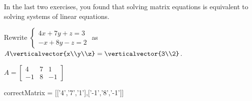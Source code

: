 \documentclass{ximera}
\begin{document}
In the last two exercises, you found that solving matrix equations is equivalent to solving systems of linear equations.

\begin{question}
  Rewrite  $\begin{cases}4x+7y+z =3\\ -x+8y-z =2\end{cases}$ as $A\verticalvector{x\\y\\z} = \verticalvector{3\\2}$.
  \begin{solution}
  	\begin{hint}
  		$A = \begin{bmatrix} 4 & 7 &1 \\ -1&8&-1\end{bmatrix}$
  	\end{hint}
  	\begin{matrix-answer}[name = A]
  		correctMatrix = [['4','7','1'],['-1','8','-1']]
  	\end{matrix-answer}
  \end{solution}
\end{question}
\end{document}
